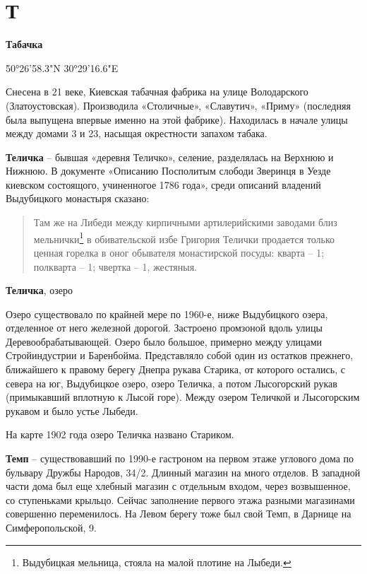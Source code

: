 \chapter*{Т}

\textbf{Табачка}

50°26'58.3"N 30°29'16.6"E

Снесена в 21 веке, Киевская табачная фабрика на улице Володарского (Златоустовская). Производила  «Столичные», «Славутич», «Приму» (последняя была выпущена впервые именно на этой фабрике). Находилась в начале улицы между домами 3 и 23, насыщая окрестности запахом табака.\\

\medskip

\textbf{Теличка} – бывшая «деревня Теличко», селение, разделялась на Верхнюю и Нижнюю. В документе «Описанию Посполитым слободи Зверинця в Уезде киевском состоящого, учиненногое 1786 года», среди описаний владений Выдубицкого монастыря сказано:

\begin{quotation}
Там же на Либеди между кирпичными артилерийскими заводами близ мельнички\footnote{Выдубицкая мельница, стояла на малой плотине на Лыбеди.} в обивательской избе Григория Телички продается только ценная горелка в оног обывателя монастирской посуды: кварта – 1; полкварта – 1; чвертка – 1, жестяныя.\end{quotation}

\medskip

\textbf{Теличка}, озеро

Озеро существовало по крайней мере по 1960-е, ниже Выдубицкого озера, отделенное от него железной дорогой. Застроено промзоной вдоль улицы Деревообрабатывающей. Озеро было большое, примерно между улицами Стройиндустрии и Баренбойма. Представляло собой один из остатков прежнего, ближайшего к правому берегу Днепра рукава Старика, от которого остались, с севера на юг, Выдубицкое озеро, озеро Теличка, а потом Лысогорский рукав (примыкавший вплотную к Лысой горе). Между озером Теличкой и Лысогорским рукавом и было устье Лыбеди.

На карте 1902 года озеро Теличка названо Стариком.\\


\medskip

\textbf{Темп} – существовавший по 1990-е гастроном на первом этаже углового дома по бульвару Дружбы Народов, 34/2. Длинный магазин на много отделов. В западной части дома был еще хлебный магазин с отдельным входом, через возвышенное, со ступеньками крыльцо. Сейчас заполнение первого этажа разными магазинами совершенно переменилось. На Левом берегу тоже был свой Темп, в Дарнице на Симферопольской, 9.\\

